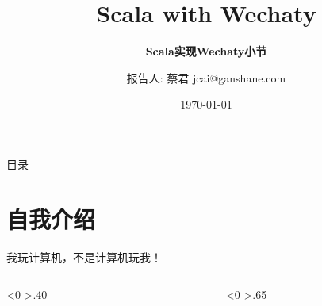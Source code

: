 \documentclass[10pt,aspectratio=43,mathserif,table]{beamer}
\title{Scala with Wechaty}
\subtitle{\fontsize{9pt}{14pt}\textbf{Scala实现Wechaty小节}}
\author{报告人: 蔡君 \newline \newline jcai@ganshane.com}
\institute{\fontsize{8pt}{14pt}https://github.com/jcai}
\date{\today}
\begin{document}

\frame{\titlepage}

\section[目录]{}   %
\begin{frame}{目录}
\tableofcontents
\end{frame}

\section{自我介绍}  %
\begin{frame}{我玩计算机，不是计算机玩我！}
\begin{columns}[T] %
\begin{column}<0->{.40\textwidth}
	\begin{figure}[thpb]
		\centering
		\label{fig:campus}
	\end{figure}
\end{column}%
\hfill%
\begin{column}<0->{.65\textwidth}
  \begin{itemize}

\end{itemize}
\end{column}
\end{columns}
\end{frame}
\end{document}
